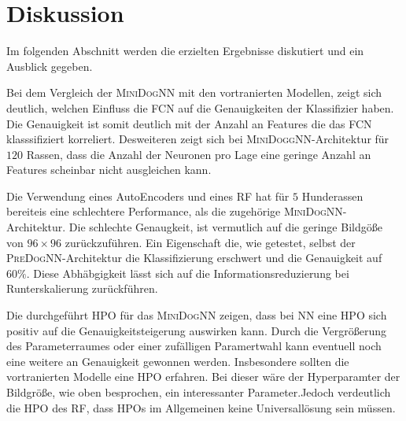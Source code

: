 \section{Diskussion}
Im folgenden Abschnitt werden die erzielten Ergebnisse diskutiert und
ein Ausblick gegeben.

Bei dem Vergleich der \textsc{MiniDogNN} mit den vortranierten Modellen,
zeigt sich deutlich, welchen Einfluss die FCN auf die Genauigkeiten der
Klassifizier haben. Die Genauigkeit ist somit deutlich mit der Anzahl an Features
die das FCN klasssifiziert korreliert. Desweiteren zeigt sich bei \textsc{MiniDoggNN}-Architektur
für $120$ Rassen, dass die Anzahl der Neuronen pro Lage eine geringe Anzahl an
Features scheinbar nicht ausgleichen kann.

Die Verwendung eines AutoEncoders und eines RF hat für $5$ Hunderassen bereiteis
eine schlechtere Performance, als die zugehörige \textsc{MiniDogNN}-Architektur.
Die schlechte Genaugkeit, ist vermutlich auf die geringe Bildgöße von $96\times96$
zurückzuführen. Ein Eigenschaft die, wie getestet, selbst der \textsc{PreDogNN}-Architektur
die Klassifizierung erschwert und die Genauigkeit auf $60\%$. Diese Abhäbgigkeit
lässt sich auf die Informationsreduzierung bei Runterskalierung zurückführen.

Die durchgeführt HPO für das \textsc{MiniDogNN} zeigen, dass bei NN eine HPO
sich positiv auf die Genauigkeitsteigerung auswirken kann. Durch die Vergrößerung
des Parameterraumes oder einer zufälligen Paramertwahl kann eventuell noch eine
weitere an Genauigkeit gewonnen werden. Insbesondere sollten die vortranierten
Modelle eine HPO erfahren. Bei dieser wäre der Hyperparamter der Bildgröße,
wie oben besprochen, ein interessanter Parameter.Jedoch verdeutlich
die HPO des RF, dass HPOs im Allgemeinen keine Universallösung sein müssen.

